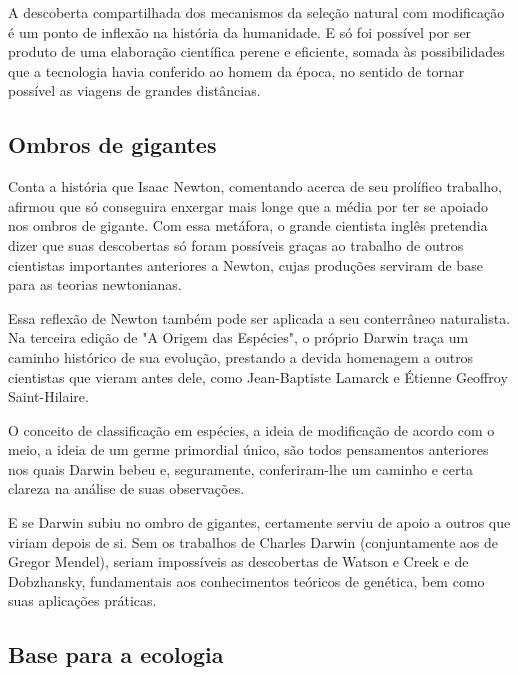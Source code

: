 \documentclass[11pt]{extarticle}
\begin{document}


A descoberta compartilhada dos mecanismos da seleção natural com modificação
é um ponto de inflexão na história da humanidade. E só foi possível por ser
produto de uma elaboração científica perene e eficiente, somada às
possibilidades que a tecnologia havia conferido ao homem da época, no sentido
de tornar possível as viagens de grandes distâncias.




\subsection{Ombros de gigantes}

Conta a história que Isaac Newton, comentando acerca de seu prolífico trabalho,
afirmou que só conseguira enxergar mais longe que a média por ter se apoiado
nos ombros de gigante. Com essa metáfora, o grande cientista inglês pretendia
dizer que suas descobertas só foram possíveis graças ao trabalho de outros
cientistas importantes anteriores a Newton, cujas produções serviram de base
para as teorias newtonianas.

Essa reflexão de Newton também pode ser aplicada a seu conterrâneo naturalista.
Na terceira edição de "A Origem das Espécies", o próprio Darwin traça um
caminho histórico de sua evolução, prestando a devida homenagem a outros
cientistas que vieram antes dele, como Jean-Baptiste Lamarck e Étienne Geoffroy
Saint-Hilaire.

O conceito de classificação em espécies, a ideia de modificação de acordo com
o meio, a ideia de um germe primordial único, são todos pensamentos anteriores
nos quais Darwin bebeu e, seguramente, conferiram-lhe um caminho e certa
clareza na análise de suas observações.

E se Darwin subiu no ombro de gigantes, certamente serviu de apoio a outros que
viriam depois de si. Sem os trabalhos de Charles Darwin (conjuntamente aos de
Gregor Mendel), seriam impossíveis as descobertas de Watson e Creek e de
Dobzhansky, fundamentais aos conhecimentos teóricos de genética, bem como suas
aplicações práticas.

\subsection{Base para a ecologia}
\end{document}

